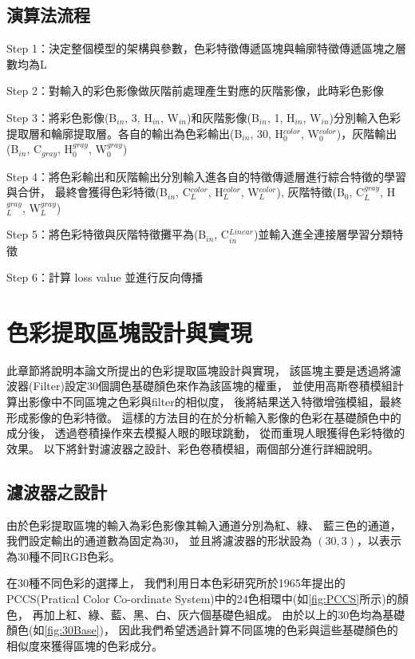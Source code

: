 \documentclass[class=NCU_thesis, crop=false]{standalone}
\begin{document}
\subsection{演算法流程}
Step 1：決定整個模型的架構與參數，色彩特徵傳遞區塊與輪廓特徵傳遞區塊之層數均為L

Step 2：對輸入的彩色影像做灰階前處理產生對應的灰階影像，此時彩色影像

Step 3：將彩色影像(B$_{in}$, 3, H$_{in}$, W$_{in}$)和灰階影像(B$_{in}$, 1, H$_{in}$, W$_{in}$)分別輸入色彩提取層和輪廓提取層。各自的輸出為色彩輸出(B$_{in}$, 30, H$^{color}_{0}$, W$^{color}_{0}$)，灰階輸出(B$_{in}$, C${_{gray}}$, H$^{gray}_{0}$, W$^{gray}_{0}$)

Step 4：將色彩輸出和灰階輸出分別輸入進各自的特徵傳遞層進行綜合特徵的學習與合併，
		最終會獲得色彩特徵(B$_{in}$, C$^{color}_{L}$, H$^{color}_{L}$, W$^{color}_{L}$), 灰階特徵(B$_{0}$, C$^{gray}_{L}$, H$^{gray}_{L}$, W$^{gray}_{L}$)

Step 5：將色彩特徵與灰階特徵攤平為(B$_{in}$, C$^{Linear}_{in}$)並輸入進全連接層學習分類特徵

Step 6：計算 loss value 並進行反向傳播

\pagebreak



\section{色彩提取區塊設計與實現}

此章節將說明本論文所提出的色彩提取區塊設計與實現，
該區塊主要是透過將濾波器(Filter)設定30個調色基礎顏色來作為該區塊的權重，
並使用高斯卷積模組計算出影像中不同區塊之色彩與filter的相似度，
後將結果送入特徵增強模組，最終形成影像的色彩特徵。
這樣的方法目的在於分析輸入影像的色彩在基礎顏色中的成分後，
透過卷積操作來去模擬人眼的眼球跳動，
從而重現人眼獲得色彩特徵的效果。
以下將針對濾波器之設計、彩色卷積模組，兩個部分進行詳細說明。

	\subsection{濾波器之設計}
	由於色彩提取區塊的輸入為彩色影像其輸入通道分別為紅、綠、 藍三色的通道，
	我們設定輸出的通道數為固定為30，
	並且將濾波器的形狀設為 $\left(30 , 3\right)$，以表示為30種不同RGB色彩。

	在30種不同色彩的選擇上，
	我們利用日本色彩研究所於1965年提出的PCCS(Pratical Color Co-ordinate System)中的24色相環中(如\cref{fig:PCCS}所示)的顏色，
	再加上紅、綠、藍、黑、白、灰六個基礎色組成。
	由於以上的30色均為基礎顏色(如\cref{fig:30Base})，
	因此我們希望透過計算不同區塊的色彩與這些基礎顏色的相似度來獲得區塊的色彩成分。
\end{document}
